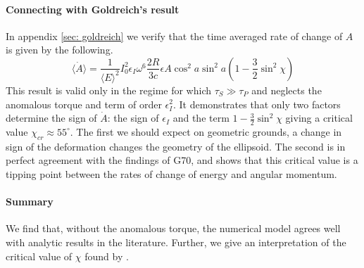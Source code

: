 \documentclass[/home/greg/Thesis/main/main.tex]{subfiles}
\begin{document}
\paragraph{Connecting with Goldreich's result}
In appendix \ref{sec: goldreich} we verify that the time averaged rate of change
of $A$ is given by the following.
\begin{equation}
\langle \dot{A} \rangle =\frac{1}{\langle E\rangle ^{2}}I_{0}^{2}\epsilon_{I}
                          \omega^{6}\frac{2R}{3c}\epsilon{A} \cos^{2} a 
                          \sin^{2}a\left(1-\frac{3}{2}\sin^{2}\chi\right) 
\end{equation}
This result is valid only in the regime for which $\tau_{S}\gg \tau_{P}$ and
neglects the anomalous torque and term of order $\epsilon_{I}^{2}$. It
demonstrates that only two factors determine the sign of $\dot{A}$: the sign of
$\epsilon_{I}$ and the term $1-\frac{3}{2}\sin^{2}\chi$ giving a critical value
$\chi_{cr}\approx55^\circ$. The first we should expect on geometric grounds, a
change in sign of the deformation changes the geometry of the ellipsoid. The
second is in perfect agreement with the findings of G70, and shows that this
critical value is a tipping point between the rates of change of energy and
angular momentum.

%
%
%


\paragraph{Summary} We find that, without the anomalous torque, the numerical
model agrees well with analytic results in the literature. Further, we give an
interpretation of the critical value of $\chi$ found by .
\end{document}
